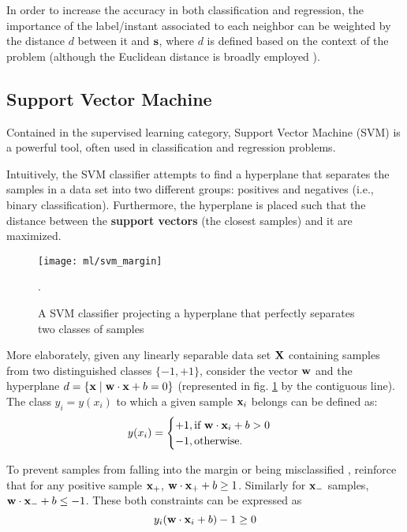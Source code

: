 In order to increase the accuracy in both classification and regression, the importance of the label/instant associated to each neighbor can be weighted by the distance $d$ between it and $\mathbf{s}$, where $d$ is defined based on the context of the problem (although the Euclidean distance is broadly employed \cite{elkan2011nearest}).

\subsection{Support Vector Machine}

Contained in the supervised learning category, Support Vector Machine (SVM) is a powerful tool, often used in classification and regression problems.

Intuitively, the SVM classifier attempts to find a hyperplane that separates the samples in a data set into two different groups: positives and negatives (i.e., binary classification). Furthermore, the hyperplane is placed such that the distance between the \textbf{support vectors} (the closest samples) and it are maximized.

\begin{figure}[H]
	\centering
	\captionsetup{justification=centering}

	\texttt{[image: ml/svm\_margin]}
	\caption{A SVM classifier projecting a hyperplane that perfectly separates two classes of samples \cite{sksvm}}.
	\label{fig:svmmargin}
\end{figure}

More elaborately, given any linearly separable data set $\mathbf{X}$ containing samples from two distinguished classes $\{-1, +1\}$, consider the vector $\mathbf{w}$ and the hyperplane $d = \{\mathbf{x} \mid \mathbf{w} \cdot \mathbf{x} + b = 0\}$ (represented in fig. \ref{fig:svmmargin} by the contiguous line). The class $y_i = y(x_i)$ to which a given sample $\mathbf{x}_i$ belongs can be defined as:
\begin{align*}
	y(x_i) = \begin{cases}
		+1, \text{if } \mathbf{w} \cdot \mathbf{x}_i +b > 0 \\
		-1, \text{otherwise.}
	\end{cases}
\end{align*}

To prevent samples from falling into the margin or being misclassified \cite{wessvmdef}, reinforce that for any positive sample $\mathbf{x}_+$, $\mathbf{w} \cdot \mathbf{x}_+ +b \geq 1$. Similarly for $\mathbf{x}_-$ samples, $\mathbf{w} \cdot \mathbf{x}_- +b \leq -1$. These both constraints can be expressed as
\begin{equation} \label{svmconst}
y_i(\mathbf{w} \cdot \mathbf{x}_i +b) -1 \geq 0
\end{equation}


